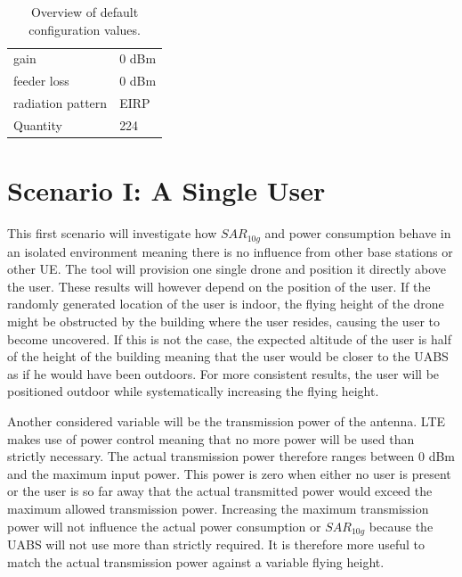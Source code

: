 \begin{table}[!htb]
\begin{tabular}[t]{ll}
        \hspace{3mm} gain                      & 0 dBm   \\ 
        \hspace{3mm} feeder loss               & 0 dBm   \\ 
        \hspace{3mm} radiation pattern         & \acs{EIRP}  \\
        \hspace{3mm} Quantity                   & 224  \\
        \toprule
\end{tabular}
\caption{Overview of default configuration values.}
\label{table:defaultconf}
\end{table}

\section{Scenario I: A Single User}
\label{sec:scenarios_s1}

This first scenario will investigate how $SAR_{10g}$ and power consumption behave in an isolated environment meaning there is no influence 
from other base stations or other \gls{UE}. The tool will provision one single drone and position it directly above the user.
These results will however depend on the position of the user. If the randomly generated location of the user is indoor, 
the flying height of the drone might be obstructed by the building where the user resides, causing the user to become uncovered. If this is not the case,
the expected altitude of the user is half of the height of the building meaning that the user would be closer to the \gls{UABS} as 
if he would have been outdoors. For more consistent results, the user will be positioned outdoor while systematically 
increasing the flying height. 

Another considered variable will be the transmission power of the antenna.
\gls{LTE} makes use of power control meaning that no more power will be used than strictly necessary. The actual 
transmission power therefore ranges between 0 dBm and the maximum input power. This power is zero when either no user is 
present or the user is so far away that the actual transmitted power would exceed the maximum allowed transmission power.
Increasing the maximum transmission power will not influence the actual power consumption or $SAR_{10g}$ because the \gls{UABS} will not use more
than strictly required. It is therefore more useful to match the actual transmission power against a variable flying height.

